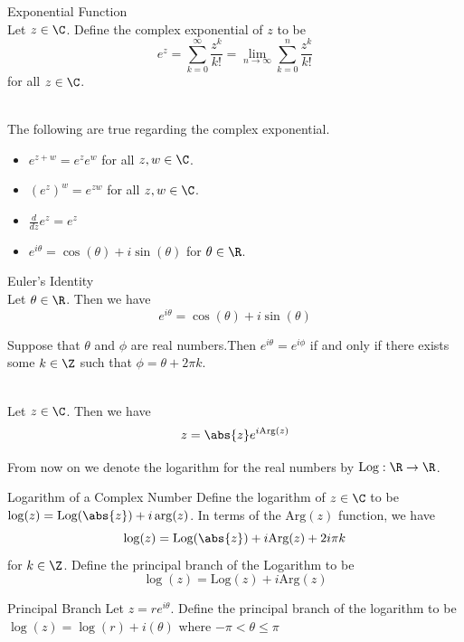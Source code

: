 \documentclass[a4paper]{article}
\begin{document}
\begin{defn}{Exponential Function}{}\\
Let $z\in\C$. Define the complex exponential of $z$ to be $$e^z=\sum_{k=0}^\infty\frac{z^k}{k!}=\lim_{n\to\infty}\sum_{k=0}^n\frac{z^k}{k!}$$ for all $z\in\C$. 
\end{defn}

\begin{prp}{}{}\\
The following are true regarding the complex exponential. 
\begin{itemize}
\item $e^{z+w}=e^ze^w$ for all $z,w\in\C$. 
\item $(e^z)^w=e^{zw}$ for all $z,w\in\C$. 
\item $\frac{d}{dz}e^z=e^z$
\item $e^{i\theta}=\cos(\theta)+i\sin(\theta)$ for $\theta\in\R$. 
\end{itemize}
\end{prp}

\begin{thm}{Euler's Identity}{}\\
Let $\theta\in\R$. Then we have $$e^{i\theta}=\cos(\theta)+i\sin(\theta)$$
\end{thm}

\begin{lmm}{}{} Suppose that $\theta$ and $\phi$ are real numbers.Then $e^{i\theta}=e^{i\phi}$ if and only if there exists some $k\in\Z$ such that $\phi=\theta+2\pi k$. 
\end{lmm}

\begin{prp}{}{}\\
Let $z\in\C$. Then we have $$z=\abs{z}e^{i\text{Arg}(z)}$$
\end{prp}

From now on we denote the logarithm for the real numbers by $\text{Log}:\R\to\R$. 

\begin{defn}{Logarithm of a Complex Number}{} Define the logarithm of $z\in\C$ to be $\log(z)=\text{Log}(\abs{z})+i\arg(z)$. In terms of the $\text{Arg}(z)$ function, we have $$\log(z)=\text{Log}(\abs{z})+i\text{Arg}(z)+2i\pi k$$ for $k\in\Z$. Define the principal branch of the Logarithm to be $$\log(z)=\text{Log}(z)+i\text{Arg}(z)$$
\end{defn}

\begin{defn}{Principal Branch}{} Let $z=re^{i\theta}$. Define the principal branch of the logarithm to be $\log(z)=\log(r)+i(\theta)$ where $-\pi<\theta\leq\pi$
\end{defn}
\end{document}

